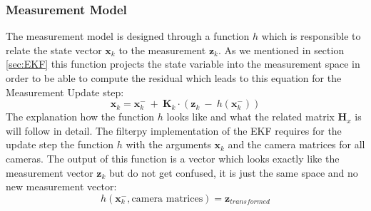 \subsubsection{Measurement Model}
The measurement model is designed through a function $h$ which is responsible to relate the state vector $\mathbf{x}_k$ to the measurement $\mathbf{z}_k$. As we mentioned in section \ref{sec:EKF} this function projects the state variable into the measurement space in order to be able to compute the residual which leads to this equation for the Measurement Update step:
\begin{equation}
\mathbf{x}_k = \mathbf{x}_k^- \ + \ \mathbf{K}_k\cdot (\mathbf{z}_k \ - \ h(\mathbf{x}_k^-))
\end{equation}
The explanation how the function $h$ looks like and what the related matrix $\mathbf{H}_x$ is will follow in detail. The filterpy implementation \cite{filterpydoc} of the EKF requires for the update step the function $h$ with the arguments $\mathbf{x}_k$ and the camera matrices for all cameras. The output of this function is a vector which looks exactly like the measurement vector $\mathbf{z}_k$ but do not get confused, it is just the same space and no new measurement vector:
\begin{equation}
h(\mathbf{x}^-_k, \text{camera matrices}) = \mathbf{z}_{transformed}
\end{equation}

